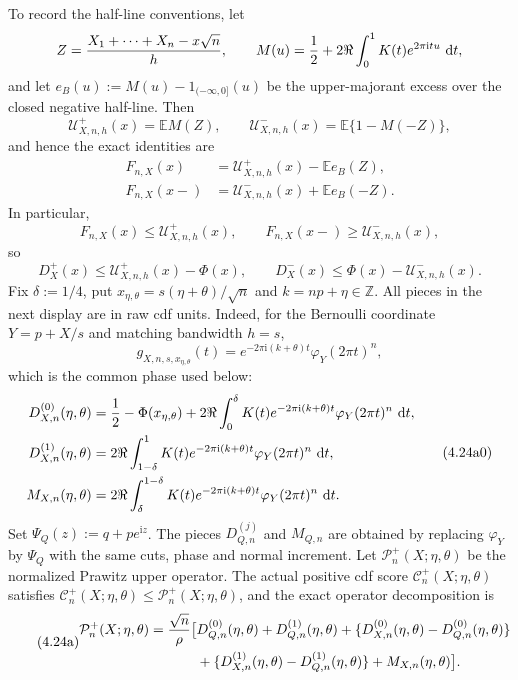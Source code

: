 \documentclass[11pt,a4paper]{article}
\numberwithin{equation}{section}
\theoremstyle{definition}
\theoremstyle{remark}
\newcommand{\E}{\mathbb E}
\newcommand{\ii}{\mathrm i}
\newcommand{\dd}{\,\mathrm d}
\begin{document}
To record the half-line conventions, let
\[
 Z={X_1+\cdots+X_n-x\sqrt n\over h},\qquad
 M(u)={1\over2}+2\Re\int_0^1K(t)e^{2\pi\ii tu}\,\dd t,
\]
and let $e_B(u):=M(u)-1_{(-\infty,0]}(u)$ be the upper-majorant
excess over the closed negative half-line.  Then
\[
 \mathcal U^+_{X,n,h}(x)=\E M(Z),\qquad
 \mathcal U^-_{X,n,h}(x)=\E\{1-M(-Z)\},
\]
and hence the exact identities are
\[
 \begin{aligned}
 F_{n,X}(x)&=\mathcal U^+_{X,n,h}(x)-\E e_B(Z),\\
 F_{n,X}(x-)&=\mathcal U^-_{X,n,h}(x)+\E e_B(-Z).
 \end{aligned}                                               \tag{4.24w}
\]
In particular,
\[
 F_{n,X}(x)\le\mathcal U^+_{X,n,h}(x),\qquad
 F_{n,X}(x-)\ge\mathcal U^-_{X,n,h}(x),
\]
so
\[
 D_X^+(x)\le\mathcal U^+_{X,n,h}(x)-\Phi(x),\qquad
 D_X^-(x)\le\Phi(x)-\mathcal U^-_{X,n,h}(x).
\]
Fix $\delta:=1/4$, put
$x_{\eta,\theta}=s(\eta+\theta)/\sqrt n$ and
$k=np+\eta\in\mathbb Z$.  All pieces in the next display are in raw cdf
units.  Indeed, for the Bernoulli coordinate $Y=p+X/s$ and matching
bandwidth $h=s$,
\[
 g_{X,n,s,x_{\eta,\theta}}(t)
 =e^{-2\pi\ii(k+\theta)t}\varphi_Y(2\pi t)^n,             \tag{4.24x}
\]
which is the common phase used below:
\[
\begin{aligned}
D^{(0)}_{X,n}(\eta,\theta)&={1\over2}-\Phi(x_{\eta,\theta})
 +2\Re\int_0^\delta K(t)e^{-2\pi\ii(k+\theta)t}
                  \varphi_Y(2\pi t)^n\,\dd t,\\
D^{(1)}_{X,n}(\eta,\theta)&=2\Re\int_{1-\delta}^1K(t)
 e^{-2\pi\ii(k+\theta)t}\varphi_Y(2\pi t)^n\,\dd t,\\
M_{X,n}(\eta,\theta)&=2\Re\int_\delta^{1-\delta}K(t)
 e^{-2\pi\ii(k+\theta)t}\varphi_Y(2\pi t)^n\,\dd t.
\end{aligned}                                                   \tag{4.24a0}
\]
Set \(\Psi_Q(z):=q+pe^{\ii z}\).  The pieces $D^{(j)}_{Q,n}$ and
$M_{Q,n}$ are obtained by replacing $\varphi_Y$ by $\Psi_Q$ with the same
cuts, phase and normal increment.  Let
$\mathcal P_n^+(X;\eta,\theta)$ be the
normalized Prawitz upper operator.  The actual positive cdf score
$\mathcal C_n^+(X;\eta,\theta)$ satisfies
$\mathcal C_n^+(X;\eta,\theta)\le\mathcal P_n^+(X;\eta,\theta)$, and the
exact operator decomposition is
\begin{equation}\tag{4.24a}
\begin{split}
 \mathcal P_n^+(X;\eta,\theta)={\sqrt n\over\rho}\big[&
 D^{(0)}_{Q,n}(\eta,\theta)+D^{(1)}_{Q,n}(\eta,\theta)
 +\{D^{(0)}_{X,n}(\eta,\theta)-D^{(0)}_{Q,n}(\eta,\theta)\}\\
 &+\{D^{(1)}_{X,n}(\eta,\theta)-D^{(1)}_{Q,n}(\eta,\theta)\}
 +M_{X,n}(\eta,\theta)\big].
\end{split}
\end{equation}
\end{document}
